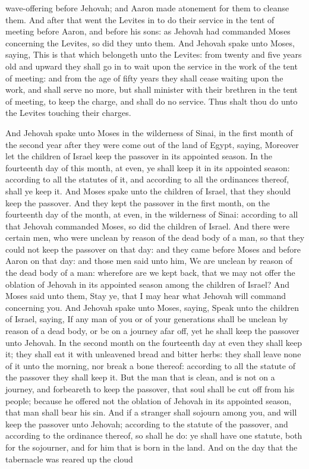 wave-offering before Jehovah; and Aaron made atonement for them to cleanse them. And after that went the Levites in to do their service in the tent of meeting before Aaron, and before his sons: as Jehovah had commanded Moses concerning the Levites, so did they unto them.  And Jehovah spake unto Moses, saying, This is that which belongeth unto the Levites: from twenty and five years old and upward they shall go in to wait upon the service in the work of the tent of meeting: and from the age of fifty years they shall cease waiting upon the work, and shall serve no more, but shall minister with their brethren in the tent of meeting, to keep the charge, and shall do no service. Thus shalt thou do unto the Levites touching their charges. 

And Jehovah spake unto Moses in the wilderness of Sinai, in the first month of the second year after they were come out of the land of Egypt, saying, Moreover let the children of Israel keep the passover in its appointed season. In the fourteenth day of this month, at even, ye shall keep it in its appointed season: according to all the statutes of it, and according to all the ordinances thereof, shall ye keep it. And Moses spake unto the children of Israel, that they should keep the passover. And they kept the passover in the first month, on the fourteenth day of the month, at even, in the wilderness of Sinai: according to all that Jehovah commanded Moses, so did the children of Israel. And there were certain men, who were unclean by reason of the dead body of a man, so that they could not keep the passover on that day: and they came before Moses and before Aaron on that day: and those men said unto him, We are unclean by reason of the dead body of a man: wherefore are we kept back, that we may not offer the oblation of Jehovah in its appointed season among the children of Israel? And Moses said unto them, Stay ye, that I may hear what Jehovah will command concerning you.  And Jehovah spake unto Moses, saying, Speak unto the children of Israel, saying, If any man of you or of your generations shall be unclean by reason of a dead body, or be on a journey afar off, yet he shall keep the passover unto Jehovah. In the second month on the fourteenth day at even they shall keep it; they shall eat it with unleavened bread and bitter herbs: they shall leave none of it unto the morning, nor break a bone thereof: according to all the statute of the passover they shall keep it. But the man that is clean, and is not on a journey, and forbeareth to keep the passover, that soul shall be cut off from his people; because he offered not the oblation of Jehovah in its appointed season, that man shall bear his sin. And if a stranger shall sojourn among you, and will keep the passover unto Jehovah; according to the statute of the passover, and according to the ordinance thereof, so shall he do: ye shall have one statute, both for the sojourner, and for him that is born in the land.  And on the day that the tabernacle was reared up the cloud 